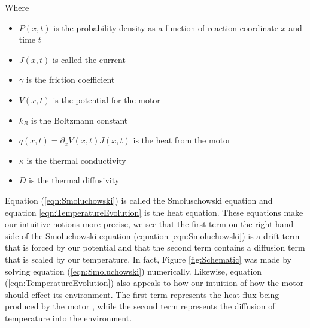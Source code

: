 Where
\begin{itemize}
\item{$P(x, t)$ is the probability density as a function of  reaction coordinate $x$ and time $t$}
\item{$J(x, t)$ is called the current}
\item{$\gamma$ is the friction coefficient}
\item{$V(x, t)$ is the potential for the motor}
\item{$k_B$ is the Boltzmann constant}
\item{$q(x, t) = \partial_x V(x, t) J(x, t)$ is the heat from the motor}
\item{$\kappa$ is the thermal conductivity}
\item{$D$ is the thermal diffusivity}
\end{itemize}

Equation (\ref{eqn:Smoluchowski}) is called the Smoluschowski equation \cite{KellerBustamante2000} and equation \ref{eqn:TemperatureEvolution} is the heat equation. These equations make our intuitive notions more precise, we see that the first term on the right hand side of the Smoluchowski equation (equation \ref{eqn:Smoluchowski}) is a drift term that is forced by our potential and that the second term contains a diffusion term that is scaled by our temperature. In fact, Figure \ref{fig:Schematic} was made by solving equation (\ref{eqn:Smoluchowski}) numerically. Likewise, equation (\ref{eqn:TemperatureEvolution}) also appeals to how our intuition of how the motor should effect its environment. The first term represents the heat flux being produced by the motor \cite{M.W.Jack2016}, while the second term represents the diffusion of temperature into the environment.

